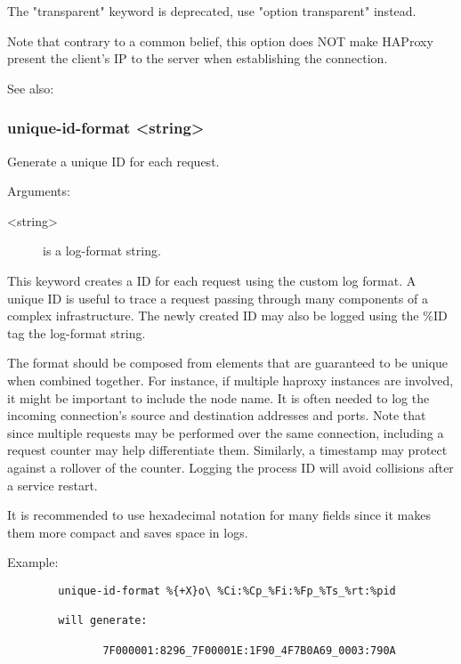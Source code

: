   The "transparent" keyword is deprecated, use "option transparent" instead.

  Note that contrary to a common belief, this option does NOT make HAProxy
  present the client's IP to the server when establishing the connection.

  See also: 

\subsubsection[unique-id-format]{unique-id-format <string>}


  Generate a unique ID for each request.


  Arguments:
  \begin{description}
  \item[<string>] is a log-format string.
  \end{description}

  This keyword creates a ID for each request using the custom log format. A
  unique ID is useful to trace a request passing through many components of
  a complex infrastructure. The newly created ID may also be logged using the
  \%ID tag the log-format string.

  The format should be composed from elements that are guaranteed to be
  unique when combined together. For instance, if multiple haproxy instances
  are involved, it might be important to include the node name. It is often
  needed to log the incoming connection's source and destination addresses
  and ports. Note that since multiple requests may be performed over the same
  connection, including a request counter may help differentiate them.
  Similarly, a timestamp may protect against a rollover of the counter.
  Logging the process ID will avoid collisions after a service restart.

  It is recommended to use hexadecimal notation for many fields since it
  makes them more compact and saves space in logs.

  Example:
  \begin{verbatim}
        unique-id-format %{+X}o\ %Ci:%Cp_%Fi:%Fp_%Ts_%rt:%pid

        will generate:

               7F000001:8296_7F00001E:1F90_4F7B0A69_0003:790A
  \end{verbatim}

